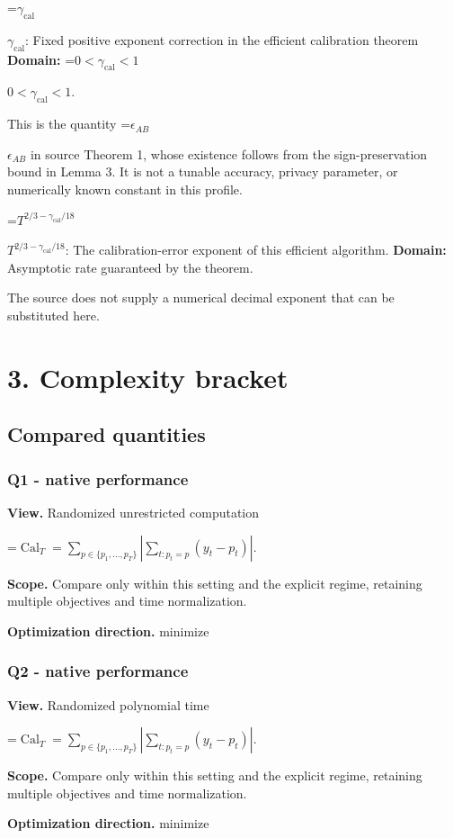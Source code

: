 \documentclass[10pt,a4paper]{article}
\newcommand{\AtlasMath}[1]{\par\begingroup\centering\setbox0=\hbox{$\displaystyle #1$}\ifdim\wd0>1.4\linewidth\typeout{ATLAS WIDE FORMULA: \the\wd0}\fi\ifdim\wd0>\linewidth\resizebox{\linewidth}{!}{\box0}\else\box0\fi\par\endgroup}
\newcommand{\AtlasInlineMath}[1]{\begingroup\setbox0=\hbox{$#1$}\ifdim\wd0>.4\linewidth\endgroup\AtlasMath{#1}\else\endgroup$#1$\fi}
\begin{document}
\AtlasInlineMath{\gamma_{\mathrm{cal}}}: Fixed positive exponent correction in the efficient calibration theorem \textbf{Domain:} \AtlasInlineMath{0<\gamma_{\mathrm{cal}}<1}.

This is the quantity \AtlasInlineMath{\epsilon_{AB}} in source Theorem 1, whose existence follows from the sign-preservation bound in Lemma 3. It is not a tunable accuracy, privacy parameter, or numerically known constant in this profile.

\AtlasInlineMath{T^{2/3-\gamma_{\mathrm{cal}}/18}}: The calibration-error exponent of this efficient algorithm. \textbf{Domain:} Asymptotic rate guaranteed by the theorem.

The source does not supply a numerical decimal exponent that can be substituted here.

\section{3. Complexity bracket}
\subsection{Compared quantities}
\subsubsection{Q1 - native performance}
\textbf{View.} Randomized unrestricted computation

\AtlasMath{\operatorname{Cal}_T=\sum_{p\in\{p_1,\ldots,p_T\}}\left|\sum_{t:p_t=p}(y_t-p_t)\right|.}
\textbf{Scope.} Compare only within this setting and the explicit regime, retaining multiple objectives and time normalization.

\textbf{Optimization direction.} minimize

\subsubsection{Q2 - native performance}
\textbf{View.} Randomized polynomial time

\AtlasMath{\operatorname{Cal}_T=\sum_{p\in\{p_1,\ldots,p_T\}}\left|\sum_{t:p_t=p}(y_t-p_t)\right|.}
\textbf{Scope.} Compare only within this setting and the explicit regime, retaining multiple objectives and time normalization.

\textbf{Optimization direction.} minimize
\end{document}
